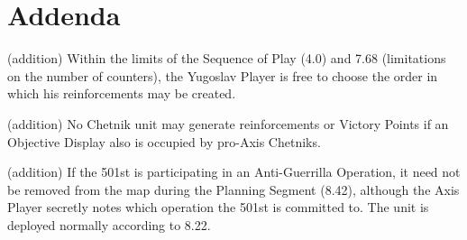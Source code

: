 \section{Addenda}
 (addition) Within the limits of the Sequence of Play (4.0) and 7.68 (limitations on the number of counters), the Yugoslav Player is free to choose the order in which his reinforcements may be created.

 (addition) No Chetnik unit may generate reinforcements or Victory Points if an Objective Display also is occupied by pro-Axis Chetniks.

 (addition) If the 501st is participating in an Anti-Guerrilla Operation, it need not be removed from the map during the Planning Segment (8.42), although the Axis Player secretly notes which operation the 501st is committed to. The unit is deployed normally according to 8.22.
